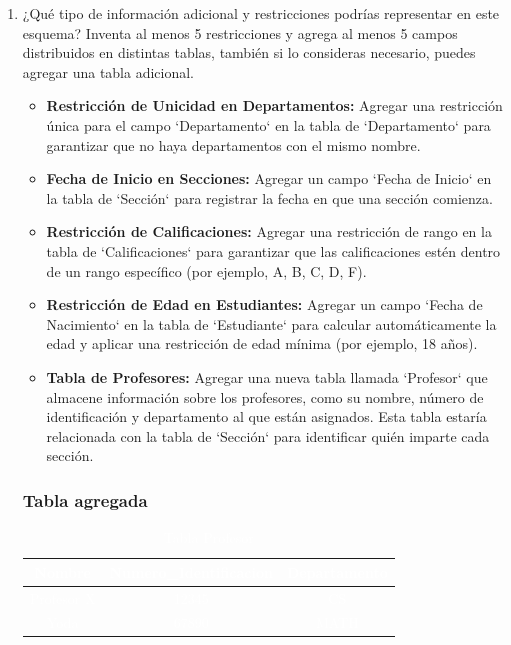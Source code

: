\documentclass[a4paper,12pt]{article}
\begin{document}
\begin{enumerate}
    \item \textcolor{sun}{¿Qué tipo de información adicional y restricciones podrías representar en este
    esquema? Inventa al menos 5 restricciones y agrega al menos 5 campos distribuidos
    en distintas tablas, también si lo consideras necesario, puedes agregar una tabla
    adicional.}

    \begin{itemize}
      \item \textbf{Restricción de Unicidad en Departamentos:} Agregar una restricción única para el campo `Departamento` en la tabla de `Departamento` para garantizar que no haya departamentos con el mismo nombre.
      
      \item \textbf{Fecha de Inicio en Secciones:} Agregar un campo `Fecha de Inicio` en la tabla de `Sección` para registrar la fecha en que una sección comienza.
      
      \item \textbf{Restricción de Calificaciones:} Agregar una restricción de rango en la tabla de `Calificaciones` para garantizar que las calificaciones estén dentro de un rango específico (por ejemplo, A, B, C, D, F).
      
      \item \textbf{Restricción de Edad en Estudiantes:} Agregar un campo `Fecha de Nacimiento` en la tabla de `Estudiante` para calcular automáticamente la edad y aplicar una restricción de edad mínima (por ejemplo, 18 años).
      
      \item \textbf{Tabla de Profesores:} Agregar una nueva tabla llamada `Profesor` que almacene información sobre los profesores, como su nombre, número de identificación y departamento al que están asignados. Esta tabla estaría relacionada con la tabla de `Sección` para identificar quién imparte cada sección.
    \end{itemize}
 
    \subsubsection*{Tabla agregada}

    \begin{table}[h]
      \centering
      \caption{\textcolor{white}{Tabla Profesor}}
      \label{tabla_profesor}
      \textcolor{white}{
      \begin{tabular}{|c|c|c|}
      \hline
          Nombre & Numero\_Identificacion & Departamento \\ \hline
          Profesor X & 12345 & CS \\ \hline
          Yoda & 67890 & MATH \\
      \hline
      \end{tabular}
      }
    \end{table}
    


\end{enumerate}
\end{document}
